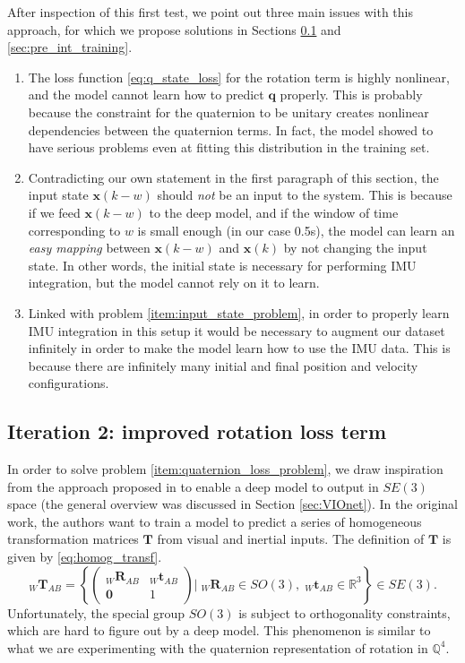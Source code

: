 After inspection of this first test, we point out three main issues with this approach, for which we propose solutions in Sections \ref{sec:lie_algebra} and \ref{sec:pre_int_training}.
\begin{enumerate}
    \item \label{item:quaternion_loss_problem} The loss function \ref{eq:q_state_loss} for the rotation term is highly nonlinear, and the model cannot learn how to predict $\mathbf{q}$ properly. 
    This is probably because the constraint for the quaternion to be unitary creates nonlinear dependencies between the quaternion terms.
    In fact, the model showed to have serious problems even at fitting this distribution in the training set.
    \item \label{item:input_state_problem} Contradicting our own statement in the first paragraph of this section, the input state $\mathbf{x}(k-w)$ should \emph{not} be an input to the system.
    This is because if we feed $\mathbf{x}(k-w)$ to the deep model, and if the window of time corresponding to $w$ is small enough (in our case 0.5s), the model can learn an \emph{easy mapping} between $\mathbf{x}(k-w)$ and $\mathbf{x}(k)$ by not changing the input state.
    In other words, the initial state is necessary for performing IMU integration, but the model cannot rely on it to learn.
    \item Linked with problem \ref{item:input_state_problem}, in order to properly learn IMU integration in this setup it would be necessary to augment our dataset infinitely in order to make the model learn how to use the IMU data.
    This is because there are infinitely many initial and final position and velocity configurations.
\end{enumerate}

\subsection{Iteration 2: improved rotation loss term}\label{sec:lie_algebra}

In order to solve problem \ref{item:quaternion_loss_problem}, we draw inspiration from the approach proposed in \cite{DBLP:journals/corr/ClarkWWMT17} to enable a deep model to output in $SE(3)$ space (the general overview was discussed in Section \ref{sec:VIOnet}).
In the original work, the authors want to train a model to predict a series of homogeneous transformation matrices $\mathbf{T}$ from visual and inertial inputs. 
The definition of $\mathbf{T}$ is given by \ref{eq:homog_transf}. 
\begin{equation}\label{eq:homog_transf}
    _{W}\mathbf{T}_{AB}=\left\{\begin{pmatrix}_{W}\mathbf{R}_{AB}&_W\mathbf{t}_{AB}\\\mathbf{0}&1\end{pmatrix}\bigg\rvert\; _{W}\mathbf{R}_{AB}\in SO(3),\; _{W}\mathbf{t}_{AB}\in \mathbb{R}^3\right\}\in SE(3).
\end{equation}
Unfortunately, the special group $SO(3)$ is subject to orthogonality constraints, which are hard to figure out by a deep model.
This phenomenon is similar to what we are experimenting with the quaternion representation of rotation in $\mathbb{Q}^4$.

